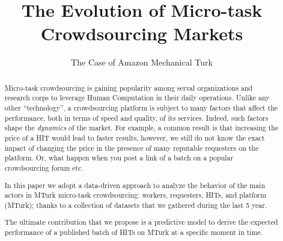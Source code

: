 \documentclass{sig-alternate}
\begin{document}
%

\title{The Evolution of Micro-task Crowdsourcing Markets}
\subtitle{The Case of Amazon Mechanical Turk}



\author{}

\maketitle
\begin{abstract}

Micro-task crowdsourcing is gaining popularity among serval organizations and research corps to leverage Human Computation in their daily operations. Unlike any other ``technology'', a crowdsourcing platform is subject to many factors that affect the performance, both in terms of speed and quality, of its services. Indeed, such factors shape the \emph{dynamics} of the market. For example, a common result is that increasing the price of a HIT would lead to faster results, however, we still do not know the exact impact of changing the price in the presence of many reputable requesters on the platform. Or, what happen when you post a link of a batch on a popular crowdsourcing forum etc.

In this paper we adopt a data-driven approach to analyze the behavior of the main actors in MTurk micro-task crowdsourcing: workers, requesters, HITs, and platform (MTurk); thanks to a collection of datasets that we gathered during the last 5 year.

The ultimate contribution that we propose is a predictive model to derive the expected performance of a published batch of HITs on MTurk at a specific moment in time.

\end{abstract}

\end{document}
